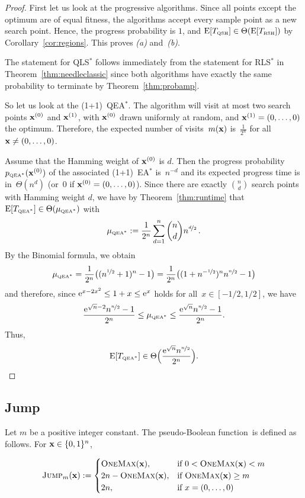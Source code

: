 \documentclass[a4paper,11pt]{article}
\begin{document}
\begin{proof}
First let us look at the progressive algorithms. Since all points except the optimum are of equal fitness, the algorithms accept every sample point as a new search point. Hence, the progress probability is $1$, and $\operatorname{E}[T_{\text{\tiny\rm QSH}}] \in \Theta(\operatorname{E}[T_{\text{\tiny\rm RSH}}])$ by Corollary~\ref{cor:regions}. This proves \emph{(a)} and~\emph{(b)}.

The statement for QLS$^*$ follows immediately from the statement for RLS$^*$ in Theorem~\ref{thm:needleclassic} since both algorithms have exactly the same probability to terminate by Theorem~\ref{thm:probamp}.

So let us look at the (1+1)~QEA$^*$. The algorithm will visit at most two search points $\xvec[0]$ and $\xvec[1]$, with $\xvec[0]$ drawn uniformly at random, and $\xvec[1] = (0,\ldots,0)$ the optimum. Therefore, the expected number of visits~$m(\xvec)$ is~$\frac{1}{2^n}$ for all $\xvec\neq (0,\ldots,0)$.

Assume that the Hamming weight of $\xvec[0]$ is $d$. Then the progress probability~$p_{\QEA^*}(\xvec[0])$ of the associated (1+1)~EA$^*$ is~$n^{-d}$ and its expected progress time is in~$\Theta(n^d)$ (or~0 if $\xvec[0]=(0,\ldots,0)$). Since there are exactly $\binom{n}{d}$ search points with Hamming weight $d$, we have by Theorem~\ref{thm:runtime} that $\operatorname{E}[T_{\text{\tiny\rm QEA}^*}]\in\Theta(\mu_{\text{\tiny\rm QEA}^*})$ with
\[
\mu_{\text{\tiny\rm QEA}^*}:=\frac{1}{2^n}\sum_{d=1}^n\binom{n}{d}n^{\nicefrac{d}{2}}\,.
\]
By the Binomial formula, we obtain
\[
\mu_{\text{\tiny\rm QEA}^*}=\frac{1}{2^n}\big((n^{\nicefrac{1}{2}}+1)^n-1\big)=\frac{1}{2^n}\big((1+n^{-\nicefrac{1}{2}})^n n^{\nicefrac{n}{2}}-1\big)
\]
and therefore, since $\mathrm{e}^{x-2x^2}\le 1+x\le \mathrm{e}^x$ holds for all~$x\in[-1/2,1/2]$, we have
\[
\frac{\mathrm{e}^{\sqrt{n}-2}n^{\nicefrac{n}{2}}-1}{2^n}\le\mu_{\text{\tiny\rm QEA}^*}\le\frac{\mathrm{e}^{\sqrt{n}}n^{\nicefrac{n}{2}}-1}{2^n}.
\]
Thus,
\[
\operatorname{E}[T_{\text{\tiny\rm QEA}^*}]\in\Theta\Big(\frac{\mathrm{e}^{\sqrt{n}}n^{\nicefrac{n}{2}}}{2^n}\Big).
\]
\end{proof}


\subsection{Jump}
\label{subsec:jump}
Let $m$ be a positive integer constant. The pseudo-Boolean function~\jumpm is defined as follows. For $\xvec\in\{0,1\}^n$,

\begin{equation}
\jumpm(\xvec):=\begin{cases}
\onemax(\xvec), & \text{if } 0 < \onemax(\xvec) < m \\
2n-\onemax(\xvec), & \text{if } \onemax(\xvec) \geq m \\
2n, & \text{if } x=(0,\ldots,0)
\end{cases}
\end{equation}
\end{document}
